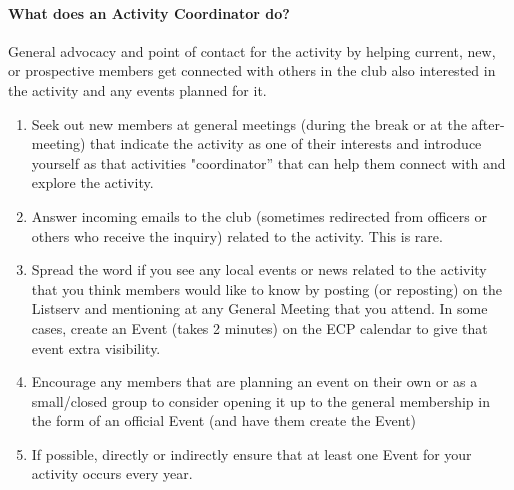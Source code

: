 \documentclass[10pt,a4paper]{article}
\begin{document}
\paragraph{What does an Activity Coordinator do?}
General advocacy and point of contact for the activity by helping current, new, or prospective members
get connected with others in the club also interested in the activity and any events planned for it.
\begin{enumerate}
\item Seek out new members at general meetings (during the break or at the after-meeting) that
indicate the activity as one of their interests and introduce yourself as that activities
"coordinator” that can help them connect with and explore the activity.
\item Answer incoming emails to the club (sometimes redirected from officers or others who receive
the inquiry) related to the activity. This is rare.
\item Spread the word if you see any local events or news related to the activity that you think
members would like to know by posting (or reposting) on the Listserv and mentioning at any
General Meeting that you attend. In some cases, create an Event (takes 2 minutes) on the ECP
calendar to give that event extra visibility.
\item Encourage any members that are planning an event on their own or as a small/closed group to
consider opening it up to the general membership in the form of an official Event (and have
them create the Event)
\item If possible, directly or indirectly ensure that at least one Event for your activity occurs every year.
\end{enumerate}

\end{document}
